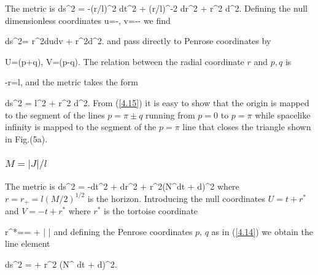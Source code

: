 The metric is
\bb
ds^2 = -(r/l)^2 dt^2 + (r/l)^{-2} dr^2 + r^2 d\phi^2.
\label{4.11}
\ee
%
Defining the null dimensionless coordinates
\bb
u=-, \;\;\; v=--
\label{4.12}
\ee
%
we find

\bb
ds^2= r^2dudv + r^2d\phi^2.
\label{4.13}
\ee
%
and pass directly to Penrose coordinates by

\bb
U=\tan\m(p+q), \;\;\; V=\tan\m(p-q).
\label{4.14}
\ee
%
The relation between the radial coordinate $r$ and $p,q$ is

\bb
-r=l,
\label{4.15}
\ee
%
and the metric takes the form

\bb
ds^2 = l^2 + r^2 d\phi^2.
\label{4.16}
\ee
%
 From (\ref{4.15}) it is easy to show that the origin is mapped
to the segment of the lines $p=\pi \pm q$ running from $p=0$ to
$p=\pi$ while spacelike infinity is mapped to the segment of the
$p=\pi$ line that closes the triangle shown in Fig.(5a).



\subsubsection{{\bf $M=|J|/l$}}

The metric is
\bb
ds^2 = -dt^2 +
dr^2 + r^2(N^{\phi}dt + d\phi)^2
\label{4.17}
\ee
%
where $r=r_+=l (M/2)^{1/2}$ is the horizon. Introducing the
null coordinates $U=t+r^{*}$ and $V=-t+r^{*}$ where $r^{*}$ is
the tortoise coordinate

\bb
r^{*}=\int {}=  +
\ln\left| \right|
\label{4.18}
\ee
%
and defining the Penrose coordinates $p,\, q$ as in (\ref{4.14}) we
obtain the line element

\bb
ds^2 = 
+ r^2 (N^{\phi} dt + d\phi)^2.
\label{4.19}
\ee

